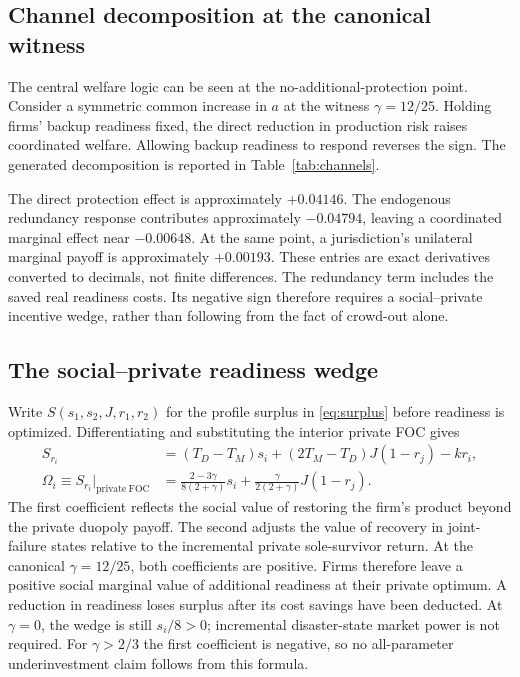 \subsection{Channel decomposition at the canonical witness}

The central welfare logic can be seen at the no-additional-protection point. Consider a symmetric common increase in $a$ at the witness $\gamma=12/25$. Holding firms' backup readiness fixed, the direct reduction in production risk raises coordinated welfare. Allowing backup readiness to respond reverses the sign. The generated decomposition is reported in Table~\ref{tab:channels}.

\begin{table}[t]
\centering
\caption{Marginal welfare channels at the canonical witness}
\label{tab:channels}

\end{table}

The direct protection effect is approximately $+0.04146$. The endogenous redundancy response contributes approximately $-0.04794$, leaving a coordinated marginal effect near $-0.00648$. At the same point, a jurisdiction's unilateral marginal payoff is approximately $+0.00193$. These entries are exact derivatives converted to decimals, not finite differences. The redundancy term includes the saved real readiness costs. Its negative sign therefore requires a social--private incentive wedge, rather than following from the fact of crowd-out alone.

\subsection{The social--private readiness wedge}

Write $S(s_1,s_2,J,r_1,r_2)$ for the profile surplus in \eqref{eq:surplus} before readiness is optimized. Differentiating and substituting the interior private FOC gives
\begin{align}
S_{r_i}
&=(T_D-T_M)s_i+(2T_M-T_D)J(1-r_j)-kr_i,\nonumber\\
\Omega_i\equiv S_{r_i}\big|_{\mathrm{private\ FOC}}
&=\frac{2-3\gamma}{8(2+\gamma)}s_i
+\frac{\gamma}{2(2+\gamma)}J(1-r_j).
\label{eq:readiness-wedge}
\end{align}
The first coefficient reflects the social value of restoring the firm's product beyond the private duopoly payoff. The second adjusts the value of recovery in joint-failure states relative to the incremental private sole-survivor return. At the canonical $\gamma=12/25$, both coefficients are positive. Firms therefore leave a positive social marginal value of additional readiness at their private optimum. A reduction in readiness loses surplus after its cost savings have been deducted. At $\gamma=0$, the wedge is still $s_i/8>0$; incremental disaster-state market power is not required. For $\gamma>2/3$ the first coefficient is negative, so no all-parameter underinvestment claim follows from this formula.

